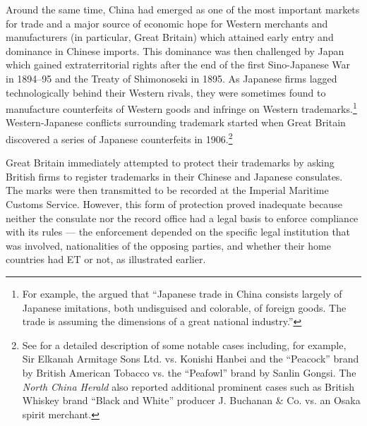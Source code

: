 \documentclass[12pt]{article}
\begin{document}

Around the same time, China had emerged as one of the most important markets for trade and a major source of economic hope for Western merchants and manufacturers (in particular, Great Britain) which attained early entry and dominance in Chinese imports. This dominance was then challenged by Japan which gained extraterritorial rights after the end of the first Sino-Japanese War in 1894–95 and the Treaty of Shimonoseki in 1895. As Japanese firms lagged technologically behind their Western rivals, they were sometimes found to  manufacture counterfeits of Western goods and infringe on Western trademarks.\footnote{For example, the \cite{PatentTrademarkReview1907} argued that ``Japanese trade in China consists largely of Japanese imitations, both undisguised and colorable, of foreign goods. The trade is assuming the dimensions of a great national industry.''} Western-Japanese conflicts surrounding trademark started when Great Britain discovered a series of Japanese counterfeits in 1906.\footnote{See \cite{Motono2011} for a detailed description of some notable cases including, for example, Sir Elkanah Armitage Sons Ltd. vs. Konishi Hanbei and the ``Peacock'' brand by British American Tobacco vs. the ``Peafowl'' brand by Sanlin Gongsi. The \emph{North China Herald}  also reported additional prominent cases such as British Whiskey brand ``Black and White'' producer J. Buchanan & Co. vs. an Osaka spirit merchant.}


Great Britain immediately attempted to protect their trademarks by asking British firms to register trademarks in their Chinese and Japanese consulates. The marks were then transmitted to be recorded at the Imperial Maritime Customs Service. However, this form of protection proved inadequate because neither the consulate nor the record office had a legal basis to enforce compliance with its rules --- the enforcement depended on the specific legal institution that was involved, nationalities of the opposing parties, and whether their home countries had ET or not, as illustrated earlier. 
\end{document}

